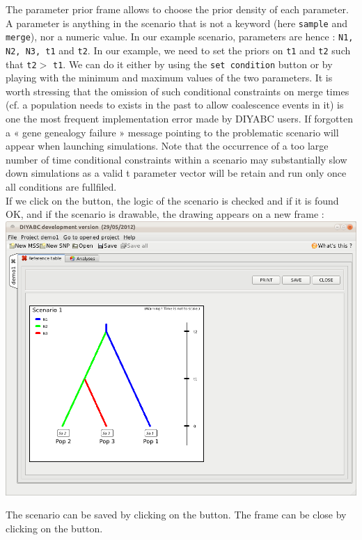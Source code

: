 The parameter prior frame allows to choose the prior density of each
parameter. A parameter is anything in the scenario that is not a keyword
(here \texttt{sample} and \texttt{merge}), nor a numeric value. In
our example scenario, parameters are hence : \texttt{N1, N2, N3, t1}
and \texttt{t2}. In our example, we need to set the priors on \texttt{t1}
and \texttt{t2} such that \texttt{t2}$>$ \texttt{t1}. We can do it
either by using the \texttt{set condition} button or by playing with
the minimum and maximum values of the two parameters. It is worth
stressing that the omission of such conditional constraints on merge
times (cf. a population needs to exists in the past to allow coalescence
events in it) is one the most frequent implementation error made by
DIYABC users. If forgotten a « gene genealogy failure » message
pointing to the problematic scenario will appear when launching simulations.
Note that the occurrence of a too large number of time conditional
constraints within a scenario may substantially slow down simulations
as a valid t parameter vector will be retain and run only once all
conditions are fullfiled.\\


If we click on the  button, the logic
of the scenario is checked and if it is found OK, and if the scenario
is drawable, the drawing appears on a new frame : \\


\includegraphics[scale=0.35]{gui_pictures/Capture-DIYABC-13}

The scenario can be saved by clicking on the 
button. The frame can be close by clicking on the 
button.\\


